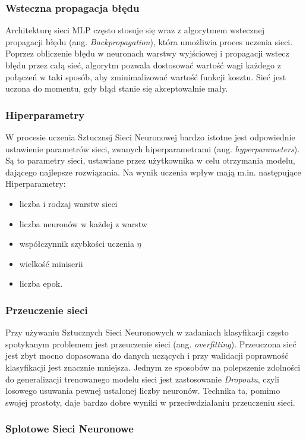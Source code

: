 \subsubsection{Wsteczna propagacja błędu}
Architekturę sieci MLP często stosuje się wraz z algorytmem wstecznej 
propagacji błędu (ang. \emph{Backpropagation}), która umożliwia proces uczenia sieci. Poprzez obliczenie błędu w neuronach warstwy wyjściowej i propagacji wstecz błędu przez całą sieć, algorytm pozwala dostosować wartość wagi każdego z połączeń w taki sposób, aby zminimalizować wartość funkcji kosztu. Sieć jest uczona do momentu, gdy błąd stanie się akceptowalnie mały. 

\subsubsection{Hiperparametry}
W procesie uczenia Sztucznej Sieci Neuronowej bardzo istotne jest odpowiednie ustawienie parametrów sieci, zwanych hiperparametrami (ang. \emph{hyperparameters}). Są to parametry sieci, ustawiane przez użytkownika w celu otrzymania modelu, dającego najlepsze rozwiązania. Na wynik uczenia wpływ mają m.in. następujące Hiperparametry:
\begin{itemize}
  \item liczba i rodzaj warstw sieci
  \item liczba neuronów w każdej z warstw
  \item współczynnik szybkości uczenia $\eta$
  \item wielkość miniserii
  \item liczba epok.
\end{itemize}

\subsubsection{Przeuczenie sieci}

Przy używaniu Sztucznych Sieci Neuronowych w zadaniach klasyfikacji często spotykanym problemem jest przeuczenie sieci (ang. \emph{overfitting}). Przeuczona sieć jest zbyt mocno dopasowana do danych uczących i przy walidacji poprawność klasyfikacji jest znacznie mniejsza. Jednym ze sposobów na polepszenie zdolności do generalizacji trenowanego modelu sieci jest zastosowanie \emph{Dropoutu}, czyli losowego usuwania pewnej ustalonej liczby neuronów. Technika ta, pomimo swojej prostoty, daje bardzo dobre wyniki w przeciwdziałaniu przeuczeniu sieci.  

\subsubsection{Splotowe Sieci Neuronowe}

